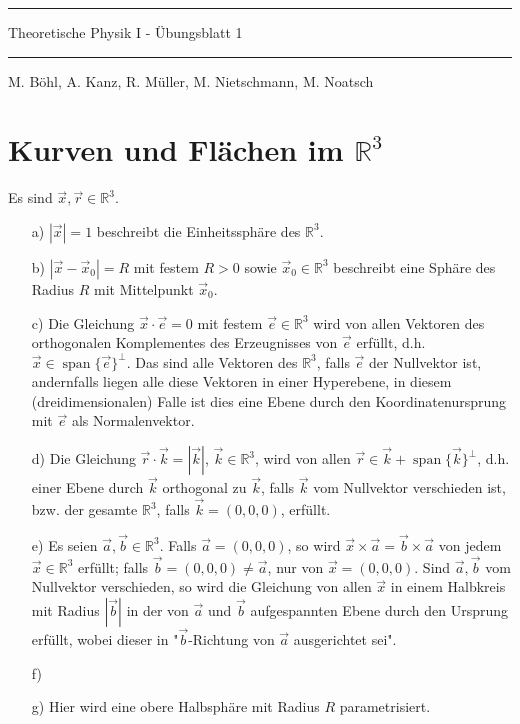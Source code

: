\documentclass[11pt]{article}
\theoremstyle{plain}
\theoremstyle{definition}
\theoremstyle{remark}
\newcommand{\R}{\mathbb{R}}
\begin{document}
\pagestyle{fancy}
\thispagestyle{plain}

\rule{\textwidth}{.5pt}
\begin{center}
\Huge{Theoretische Physik I - Übungsblatt 1}
\end{center}

\rule{\textwidth}{.5pt}
\text{} \hfill M. Böhl, A. Kanz, R. Müller, M. Nietschmann, M. Noatsch




\section{Kurven und Flächen im $ \R^3 $} 

Es sind $ \vec{x},\vec{r} \in \R^3 $. 
\begin{itemize}
\item[a)] 
$ | \vec{x} | = 1 $ beschreibt die Einheitssphäre des $ \R^3 $. 
\item[b)] 
$ | \vec{x} - \vec{x}_0 | = R $ mit festem $ R > 0 $ sowie $ \vec{x}_0 \in \R^3 $ beschreibt eine Sphäre des Radius $ R $ mit Mittelpunkt $ \vec{x}_0 $. 
\item[c)] 
Die Gleichung $ \vec{x} \cdot \vec{e} = 0 $ mit festem $ \vec{e} \in \R^3 $ 
wird von allen Vektoren des orthogonalen Komplementes des Erzeugnisses von $ \vec{e} $ erfüllt, d.h. $ \vec{x} \in \operatorname{span} \{ \vec{e} \}^\perp $. 
Das sind alle Vektoren des $ \R^3 $, falls $ \vec{e} $ der Nullvektor ist, andernfalls liegen alle diese Vektoren in einer Hyperebene, in diesem (dreidimensionalen) Falle ist dies eine Ebene durch den Koordinatenursprung mit $ \vec{e} $ als Normalenvektor. 
\item[d)] 
Die Gleichung $ \vec r \cdot \vec k = | \vec k | $, $ \vec k \in\R^3 $, wird von allen $ \vec r \in \vec k + \operatorname{span} \{ \vec k \}^\perp $, d.h. einer Ebene durch $ \vec k $ orthogonal zu $ \vec k $, falls $ \vec k $ vom Nullvektor verschieden ist, bzw. der gesamte $ \R^3 $, falls $ \vec k = (0,0,0) $, erfüllt. 
\item[e)] 
Es seien $ \vec a, \vec b \in \R^3 $. Falls $ \vec a = (0,0,0) $, so wird $ \vec x \times \vec a = \vec b \times \vec a $ von jedem $ \vec x \in \R^3 $ erfüllt; falls $ \vec b = (0,0,0) \neq \vec a $, nur von $ \vec x = (0,0,0) $. Sind $ \vec a, \vec b $ vom Nullvektor verschieden, so wird die Gleichung von allen $ \vec x $ in einem Halbkreis mit Radius $ |\vec b| $ in der von $ \vec a $ und $ \vec b $ aufgespannten Ebene durch den Ursprung erfüllt, wobei dieser in "$ \vec b $-Richtung von $ \vec a $ ausgerichtet sei". 
\item[f)] 

\item[g)] 
Hier wird eine obere Halbsphäre mit Radius $ R $ parametrisiert. 
\end{itemize}
\end{document}
